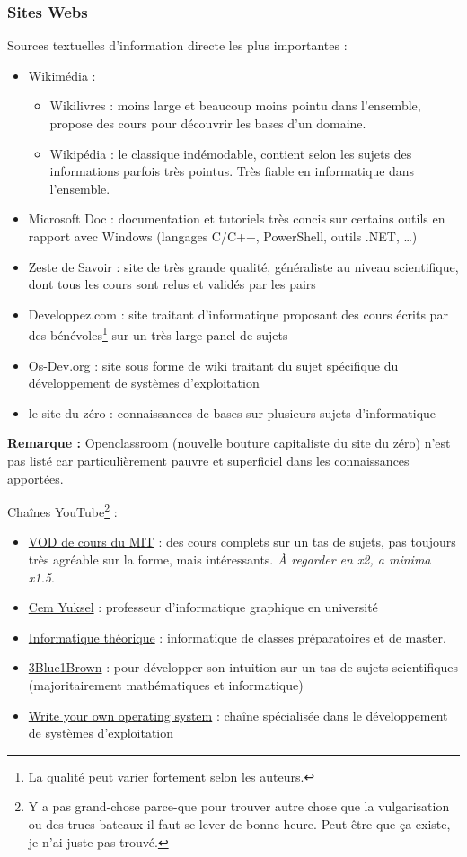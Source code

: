 \documentclass[../../../main.tex]{subfiles}
\begin{document}
\subsubsection{Sites Webs}
Sources textuelles d'information directe les plus importantes :
\begin{itemize}
	\item Wikimédia :
		\begin{itemize}
			\item Wikilivres : moins large et beaucoup moins pointu dans l'ensemble, propose des cours pour découvrir les bases d'un domaine.
			\item Wikipédia : le classique indémodable, contient selon les sujets des informations parfois très pointus. Très fiable en informatique dans l'ensemble.
		\end{itemize}
	\item Microsoft Doc : documentation et tutoriels très concis sur certains outils en rapport avec Windows (langages C/C++, PowerShell, outils .NET, \dots)
	\item Zeste de Savoir : site de très grande qualité, généraliste au niveau scientifique, dont tous les cours sont relus et validés par les pairs
	\item Developpez.com : site traitant d'informatique proposant des cours écrits par des bénévoles\footnote{La qualité peut varier fortement selon les auteurs.} sur un très large panel de sujets
	\item Os-Dev.org : site sous forme de wiki traitant du sujet spécifique du développement de systèmes d'exploitation
	\item le site du zéro : connaissances de bases sur plusieurs sujets d'informatique
\end{itemize}
\textbf{Remarque : }Openclassroom (nouvelle bouture capitaliste du site du zéro) n'est pas listé car particulièrement pauvre et superficiel dans les connaissances apportées.

Chaînes YouTube\footnote{Y a pas grand-chose parce-que pour trouver autre chose que la vulgarisation ou des trucs bateaux il faut se lever de bonne heure. Peut-être que ça existe, je n'ai juste pas trouvé.} :
\begin{itemize}
	\item \href{https://www.youtube.com/@mitocw}{VOD de cours du MIT} : des cours complets sur un tas de sujets, pas toujours très agréable sur la forme, mais intéressants. \textit{À regarder en x2, a minima x1.5}.
	\item \href{https://www.youtube.com/@cem_yuksel}{Cem Yuksel} : professeur d'informatique graphique en université
	\item \href{https://www.youtube.com/@informatiquetheorique9146}{Informatique théorique} : informatique de classes préparatoires et de master.
	\item \href{https://www.youtube.com/@3blue1brown}{3Blue1Brown} : pour développer son intuition sur un tas de sujets scientifiques (majoritairement mathématiques et informatique)
	\item \href{https://www.youtube.com/@writeyourownoperatingsystem}{Write your own operating system} : chaîne spécialisée dans le développement de systèmes d'exploitation
\end{itemize}
\end{document}
